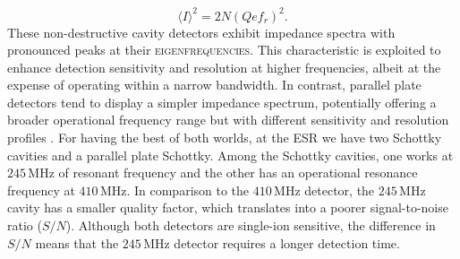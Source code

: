 \begin{equation}
    \langle I \rangle^2 = 2N\left(Qef_r\right)^2.
    \label{eq:chap2:schottkyI}
\end{equation}
These non-destructive cavity detectors exhibit impedance spectra with pronounced peaks at their \textsc{eigenfrequencies}. This characteristic is exploited to enhance detection sensitivity and resolution at higher frequencies, albeit at the expense of operating within a narrow bandwidth. In contrast, parallel plate detectors tend to display a simpler impedance spectrum, potentially offering a broader operational frequency range but with different sensitivity and resolution profiles \cite{shahab_thesis}. 
For having the best of both worlds, at the \textsc{ESR} we have two Schottky cavities and a parallel plate Schottky. Among the Schottky cavities, one works at $245$\,MHz of resonant frequency and the other has an operational resonance frequency at $410$\,MHz. In comparison to the $410$\,MHz detector, the $245$\,MHz cavity has a smaller quality factor, which translates into a poorer signal-to-noise ratio ($S/N$). Although both detectors are single-ion sensitive, the difference in $S/N$ means that the $245$\,MHz detector requires a longer detection time.

